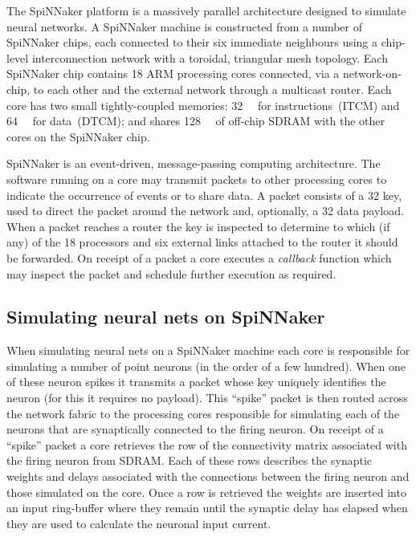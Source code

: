 \documentclass[conference]{IEEEtran}
\begin{document}
The SpiNNaker platform is a massively parallel architecture designed to simulate neural networks.
A SpiNNaker machine is constructed from a number of SpiNNaker chips, each connected to their six immediate neighbours using a chip-level interconnection network with a toroidal, triangular mesh topology.
Each SpiNNaker chip contains 18 ARM processing cores connected, via a network-on-chip, to each other and the external network through a multicast router.
Each core has two small tightly-coupled memories: \SI{32}{\kibi\byte} for instructions~(ITCM) and \SI{64}{\kibi\byte} for data~(DTCM); and shares \SI{128}{\mebi\byte} of off-chip SDRAM with the other cores on the SpiNNaker chip.

SpiNNaker is an event-driven, message-passing computing architecture.
The software running on a core may transmit packets to other processing cores to indicate the occurrence of events or to share data.
A packet consists of a \SI{32}{\bit} key, used to direct the packet around the network and, optionally, a \SI{32}{\bit} data payload.
When a packet reaches a router the key is inspected to determine to which (if any) of the 18 processors and six external links attached to the router it should be forwarded.
On receipt of a packet a core executes a \textit{callback} function which may inspect the packet and schedule further execution as required.

  \subsection{Simulating neural nets on SpiNNaker}
  \label{sef:background/nn}

When simulating neural nets on a SpiNNaker machine each core is responsible for simulating a number of point neurons (in the order of a few hundred).
When one of these neuron spikes it transmits a packet whose key uniquely identifies the neuron (for this it requires no payload).
This ``spike'' packet is then routed across the network fabric to the processing cores responsible for simulating each of the neurons that are synaptically connected to the firing neuron.
On receipt of a ``spike'' packet a core retrieves the row of the connectivity matrix associated with the firing neuron from SDRAM.
Each of these rows describes the synaptic weights and delays associated with the connections between the firing neuron and those simulated on the core.
Once a row is retrieved the weights are inserted into an input ring-buffer where they remain until the synaptic delay has elapsed when they are used to calculate the neuronal input current.
\end{document}
